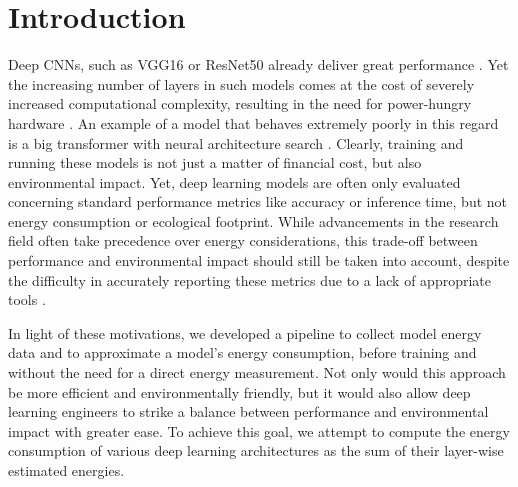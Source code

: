 \section{Introduction}
\label{sec:introduction} 
Deep CNNs, such as VGG16 or ResNet50 already deliver great performance \citep{vgg_simonyan2014very,restnet_DBLP:journals/corr/HeZRS15}. Yet the increasing number of layers in such models comes at the cost of severely increased computational complexity, resulting in the need for power-hungry hardware \citep{comp_lim_DBLP:journals/corr/abs-2007-05558, comp_lim2_DBLP:journals/corr/JinYIK16}. An example of a model that behaves extremely poorly in this regard is a big transformer with neural architecture search \citep{DBLP:journals/corr/abs-1906-02243}. Clearly, training and running these models is not just a matter of financial cost, but also environmental impact. Yet, deep learning models are often only evaluated concerning standard performance metrics like accuracy or inference time, but not energy consumption or ecological footprint.  
While advancements in the research field often take precedence over energy considerations, this trade-off between performance and environmental impact should still be taken into account, despite the difficulty in accurately reporting these metrics due to a lack of appropriate tools \citep{impact_DBLP:journals/corr/abs-1910-09700, estimation_of_energy_GARCIAMARTIN201975}.

In light of these motivations, we developed a pipeline to collect model energy data and to approximate a model's energy consumption, before training and without the need for a direct energy measurement. Not only would this approach be more efficient and environmentally friendly, but it would also allow deep learning engineers to strike a balance between performance and environmental impact with greater ease. To achieve this goal, we attempt to compute the energy consumption of various deep learning architectures as the sum of their layer-wise estimated energies.



